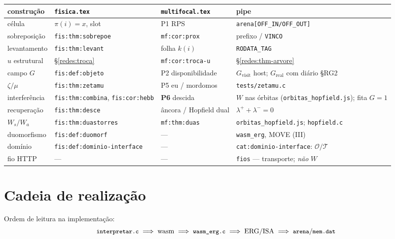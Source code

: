 \documentclass[11pt,a4paper]{article}
\newcommand{\code}[1]{\texttt{\small #1}}
\providecommand{\pt}[1]{\textbf{P#1}}
\begin{document}
\begin{center}
{\footnotesize
\begin{tabular}{@{}>{\raggedright\arraybackslash}p{}>{\raggedright\arraybackslash}p{}>{\raggedright\arraybackslash}p{}>{\raggedright\arraybackslash}p{}@{}}
\toprule
construção & \code{fisica.tex} & \code{multifocal.tex} & pipe \\
\midrule
célula & $\pi(i)=x$, slot & P1 RPS & \code{arena[OFF\_IN/OFF\_OUT]} \\
sobreposição & \code{fis:thm:sobrepoe} & \code{mf:cor:prox} & prefixo / \code{VINCO} \\
levantamento & \code{fis:thm:levant} & folha $k(i)$ & \code{RODATA\_TAG} \\
$u$ estrutural & §\ref{redes:troca} & \code{mf:cor:troca-u} & §\ref{redes:thm-arvore} \\
campo $G$ & \code{fis:def:objeto} & P2 disponibilidade &
$G_{\mathrm{visit}}$ host; $G_{\mathrm{real}}$ com diário §RG2 \\
$\zeta/\mu$ & \code{fis:thm:zetamu} & P5 eu / mordomos & \code{tests/zetamu.c} \\
interferência & \code{fis:thm:combina}, \code{fis:cor:hebb} & \pt{6} descida & $W$ nas órbitas (\code{orbitas\_hopfield.js}); fita $G=1$ \\
recuperação & \code{fis:thm:desce} & âncora / Hopfield dual & $\lambda^{+}+\lambda^{-}=0$ \\
$W_s/W_a$ & \code{fis:thm:duastorres} & \code{mf:thm:duas} & \code{orbitas\_hopfield.js}; \code{hopfield.c} \\
duomorfismo & \code{fis:def:duomorf} & --- & \code{wasm\_erg}, MOVE (III) \\
domínio & \code{fis:def:dominio-interface} & --- & \code{cat:dominio-interface}: $\mathcal{O}/\mathcal{T}$ \\
fio HTTP & --- & --- & \code{fios} --- transporte; \emph{não} $W$ \\
\bottomrule
\end{tabular}}
\end{center}

\section{Cadeia de realização}\label{redes:cadeia}

\noindent Ordem de leitura na implementação:
\[
\text{\code{interpretar.c}}
\;\Longrightarrow\;
\text{wasm}
\;\Longrightarrow\;
\text{\code{wasm\_erg.c}}
\;\Longrightarrow\;
\text{ERG/ISA}
\;\Longrightarrow\;
\text{\code{arena}/\code{mem.dat}}
\]
\end{document}
